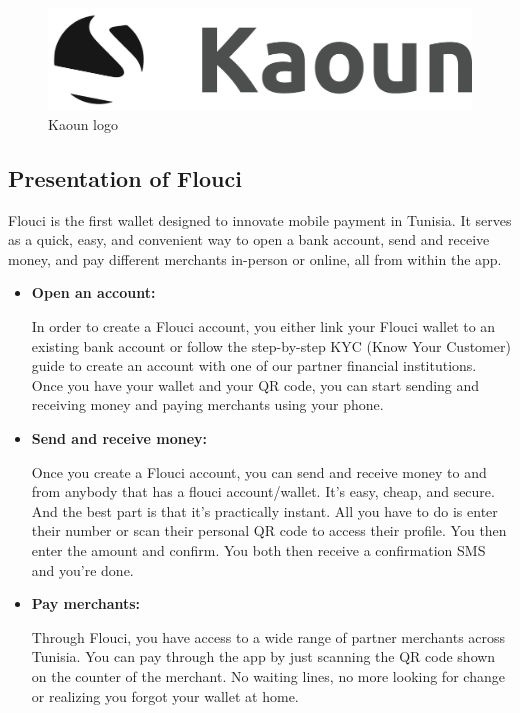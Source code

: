 \begin{spacing}{1.2}
\begin{figure}[!ht]\centering
\includegraphics[scale=0.3]{kaounlogo.png}
\caption{Kaoun logo}
\label{fig:fig1}
\end{figure}


\subsection{Presentation of Flouci}
Flouci is the first wallet designed to innovate mobile payment in Tunisia. It serves as a quick, easy, and convenient way to open a bank account, send and receive money, and pay different merchants in-person or online, all from within the app. 
\begin{itemize}
  \item \textbf{Open an account:}
  
  In order to create a Flouci account, you either link your Flouci wallet to an existing bank account or follow the step-by-step KYC (Know Your Customer) guide to create an account with one of our partner financial institutions. Once you have your wallet and your QR code, you can start sending and receiving money and paying merchants using your phone. 

  \item \textbf{Send and receive money:}
  
  Once you create a Flouci account, you can send and receive money to and from anybody that has a flouci account/wallet. It's easy, cheap, and secure. And the best part is that it's practically instant. All you have to do is enter their number or scan their personal QR code to access their profile. You then enter the amount and confirm. You both then receive a confirmation SMS and you're done.
  \item \textbf{Pay merchants:}
  
  Through Flouci, you have access to a wide range of partner merchants across Tunisia. You can pay through the app by just scanning the QR code shown on the counter of the merchant. No waiting lines, no more looking for change or realizing you forgot your wallet at home. 
\end{itemize}


\end{spacing}
